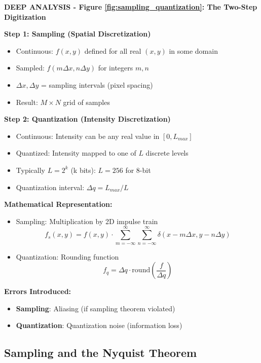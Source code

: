 \documentclass[12pt,a4paper]{article}
\begin{document}
\begin{deepexplanation}
\textbf{DEEP ANALYSIS - Figure \ref{fig:sampling_quantization}: The Two-Step Digitization}

\textbf{Step 1: Sampling (Spatial Discretization)}
\begin{itemize}
    \item Continuous: $f(x, y)$ defined for all real $(x, y)$ in some domain
    \item Sampled: $f(m\Delta x, n\Delta y)$ for integers $m, n$
    \item $\Delta x, \Delta y$ = sampling intervals (pixel spacing)
    \item Result: $M \times N$ grid of samples
\end{itemize}

\textbf{Step 2: Quantization (Intensity Discretization)}
\begin{itemize}
    \item Continuous: Intensity can be any real value in $[0, L_{max}]$
    \item Quantized: Intensity mapped to one of $L$ discrete levels
    \item Typically $L = 2^k$ (k bits): $L = 256$ for 8-bit
    \item Quantization interval: $\Delta q = L_{max} / L$
\end{itemize}

\textbf{Mathematical Representation:}
\begin{itemize}
    \item Sampling: Multiplication by 2D impulse train
    \[
    f_s(x,y) = f(x,y) \cdot \sum_{m=-\infty}^{\infty} \sum_{n=-\infty}^{\infty} \delta(x - m\Delta x, y - n\Delta y)
    \]
    \item Quantization: Rounding function
    \[
    f_q = \Delta q \cdot \text{round}\left(\frac{f}{\Delta q}\right)
    \]
\end{itemize}

\textbf{Errors Introduced:}
\begin{itemize}
    \item \textbf{Sampling}: Aliasing (if sampling theorem violated)
    \item \textbf{Quantization}: Quantization noise (information loss)
\end{itemize}
\end{deepexplanation}

\subsection{Sampling and the Nyquist Theorem}
\end{document}
